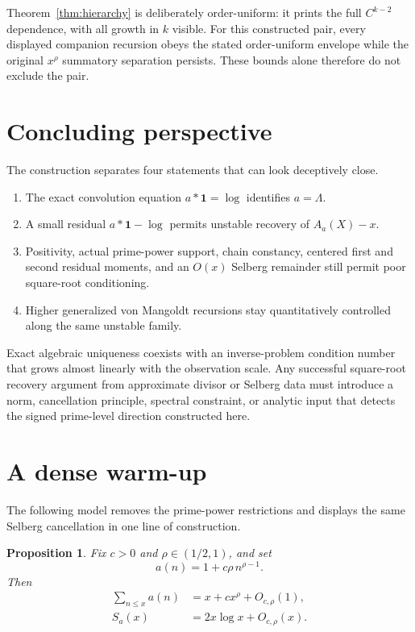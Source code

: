 \documentclass[11pt,a4paper]{amsart}
\newtheorem{proposition}[theorem]{Proposition}
\theoremstyle{definition}
\newcommand{\1}{\mathbf 1}
\begin{document}
Theorem~\ref{thm:hierarchy} is deliberately order-uniform: it prints the full
$C^{k-2}$ dependence, with all growth in $k$ visible.  For this constructed
pair, every displayed companion recursion obeys the stated order-uniform
envelope while the original $x^\rho$ summatory separation persists.  These
bounds alone therefore do not exclude the pair.

\section{Concluding perspective}

The construction separates four statements that can look deceptively close.
\begin{enumerate}[label=\textup{(\roman*)},leftmargin=2.2em]
 \item The exact convolution equation $a*\1=\log$ identifies $a=\Lambda$.
 \item A small residual $a*\1-\log$ permits unstable recovery of $A_a(X)-x$.
 \item Positivity, actual prime-power support, chain constancy, centered first and second residual moments, and an $O(x)$ Selberg remainder still permit poor square-root conditioning.
 \item Higher generalized von Mangoldt recursions stay quantitatively controlled along the same unstable family.
\end{enumerate}
Exact algebraic uniqueness coexists with an inverse-problem condition number
that grows almost linearly with the observation scale.  Any successful
square-root recovery argument from approximate divisor or Selberg data must
introduce a norm, cancellation principle, spectral constraint, or analytic
input that detects the signed prime-level direction constructed here.

\appendix

\section{A dense warm-up}\label{app:dense}

The following model removes the prime-power restrictions and displays the same Selberg cancellation in one line of construction.

\begin{proposition}\label{prop:dense}
Fix $c>0$ and $\rho\in(1/2,1)$, and set
\[
 a(n)=1+c\rho\,n^{\rho-1}.
\]
Then
\begin{align}
 \sum_{n\le x}a(n)&=x+cx^\rho+O_{c,\rho}(1),\label{eq:dense-sum}\\
 S_a(x)&=2x\log x+O_{c,\rho}(x).
\end{align}
\end{proposition}
\end{document}
